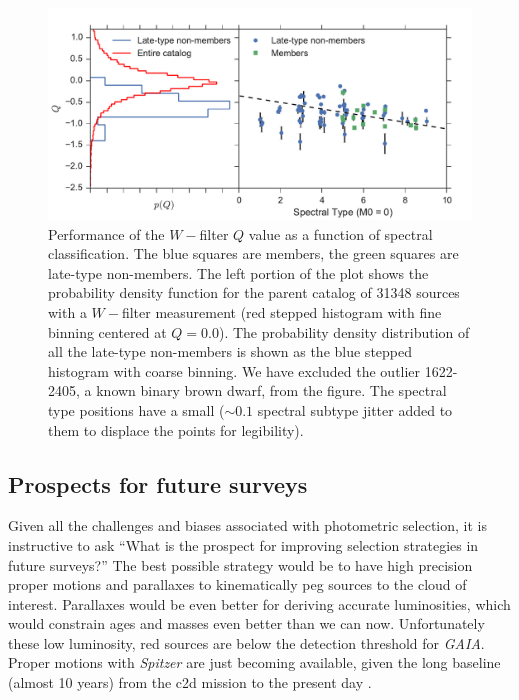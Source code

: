 \begin{figure}[ht!]
  \caption[Performance of the $W-$filter $Q$ value as a function of spectral type]{Performance of the $W-$filter $Q$ value as a function of spectral classification.  The blue squares are members, the green squares are late-type non-members.  The left portion of the plot shows the probability density function for the parent catalog of 31348 sources with a $W-$filter measurement (red stepped histogram with fine binning centered at $Q=0.0$).  The probability density distribution of all the late-type non-members is shown as the blue stepped histogram with coarse binning. We have excluded the outlier 1622-2405, a known binary brown dwarf, from the figure.  The spectral type positions have a small ($\sim0.1$ spectral subtype jitter added to them to displace the points for legibility).\label{fig_W_results} }
\centering
\includegraphics[scale=0.6]{chIMACS/figures/W_filter_results}
\end{figure}

\subsection{Prospects for future surveys}
Given all the challenges and biases associated with photometric selection, it is instructive to ask ``What is the prospect for improving selection strategies in future surveys?''  The best possible strategy would be to have high precision proper motions and parallaxes to kinematically peg sources to the cloud of interest.  Parallaxes would be even better for deriving accurate luminosities, which would constrain ages and masses even better than we can now.  Unfortunately these low luminosity, red sources are below the detection threshold for \emph{GAIA}.  Proper motions with \emph{Spitzer} are just becoming available, given the long baseline (almost 10 years) from the c2d mission to the present day \citep{2012sptz.prop90071K}.

